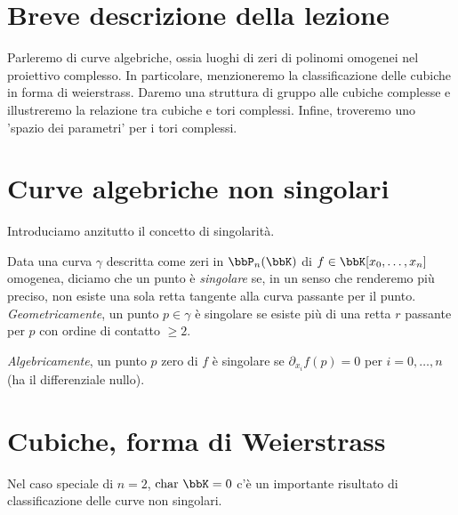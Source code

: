 
\section{Breve descrizione della lezione}
Parleremo di curve algebriche, ossia luoghi di zeri di polinomi omogenei nel proiettivo complesso. In particolare, menzioneremo la classificazione delle cubiche in forma di weierstrass. Daremo una struttura di gruppo alle cubiche complesse e illustreremo la relazione tra cubiche e tori complessi. Infine, troveremo uno 'spazio dei parametri' per i tori complessi.
\section{Curve algebriche non singolari}

Introduciamo anzitutto il concetto di singolarità.

Data una curva $\gamma$ descritta come zeri in $\bbP_n(\bbK)$ di $f \in \bbK[x_0, \ldots,x_n]$ omogenea, diciamo che un punto è 
\textit{singolare} se, in un senso che renderemo più preciso, non esiste una sola retta tangente alla curva passante per il punto. \textit{Geometricamente}, un punto $p \in \gamma$ è singolare se esiste più di una retta $r$ passante per $p$ con ordine di contatto $\geq 2$. 
\vspace{1em}


\textit{Algebricamente}, un punto $p$ zero di $f$ è singolare se $\partial_{x_i}f(p)=0$ per $i=0,\ldots,n$ (ha il differenziale nullo). 


\section{Cubiche, forma di Weierstrass}
Nel caso speciale di $n=2$, $\chr \bbK = 0$ c'è un importante risultato di classificazione delle curve non singolari. 


